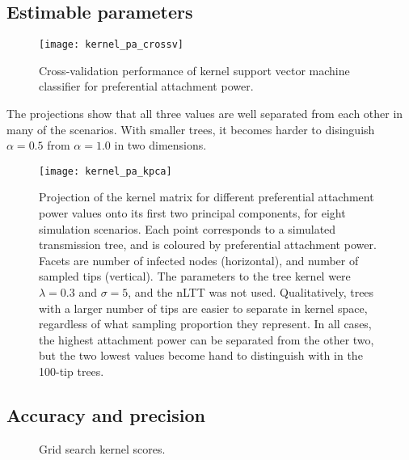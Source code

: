\subsection{Estimable parameters}

\begin{figure}[ht]
  \centering
  \label{fig:pacrossv}
  \texttt{[image: kernel\_pa\_crossv]}
  \caption[Cross-validation performance of kernel support vector machine
  classifier for preferential attachment power]{
    Cross-validation performance of kernel support vector machine classifier
    for preferential attachment power.
  }
\end{figure}

The projections show that all three values are well separated from each other
in many of the scenarios. With smaller trees, it becomes harder to disinguish
$\alpha = 0.5$ from $\alpha = 1.0$ in two dimensions.

\begin{figure}[ht]
  \centering
  \label{fig:pakpca}
  \texttt{[image: kernel\_pa\_kpca]}
  \caption[Projection of kernel matrix for different attachment power values
  onto its first two principal components]{
    Projection of the kernel matrix for different preferential attachment power
    values onto its first two principal components, for eight simulation
    scenarios. Each point corresponds to a simulated transmission tree, and is
    coloured by preferential attachment power. Facets are number of infected
    nodes (horizontal), and number of sampled tips (vertical). The parameters
    to the tree kernel were $\lambda = 0.3$ and $\sigma = 5$, and the nLTT was
    not used. Qualitatively, trees with a larger number of tips are easier to
    separate in kernel space, regardless of what sampling proportion they
    represent. In all cases, the highest attachment power can be separated from
    the other two, but the two lowest values become hand to distinguish with in
    the 100-tip trees.
  }
\end{figure}

\subsection{Accuracy and precision}

\begin{figure}[ht]
  \centering
  \caption{Grid search kernel scores.}
  \label{fig:gridkernel}
\end{figure}
